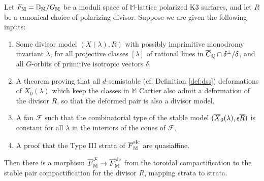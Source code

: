 \documentclass[table,x11names]{amsart}
\begin{document}
\begin{theorem}\label{threeinputs} Let $F_{\mathbb M}=\mathbb{D}_{\mathbb M}/G_{\mathbb M}$
be a moduli space of $\mathbb{M}$-lattice polarized K3 surfaces, and let $R$ be a canonical choice of
polarizing divisor. Suppose we are given the following inputs:
\begin{enumerate} 
\item[\bf (div)] Some divisor model $(X(\lambda),R)$ with
  possibly imprimitive
  monodromy invariant $\lambda$,
for all projective classes
$[\lambda]$ of rational lines in ${\overline C}_{\mathbb{Q}}\cap \delta^\perp/\delta$, and all $G$-orbits of
primitive isotropic vectors $\delta$.
\item[\bf (d-ss)] A theorem proving that all $d$-semistable (cf. Definition \ref{def:dss}) deformations of
$X_0(\lambda)$ which keep the classes in $\mathbb{M}$ Cartier also admit a deformation
of the divisor $R$, so that the deformed pair is also a divisor model.
\item[\bf (fan)] A fan $\mathcal{F}$ such that the combinatorial type of the stable model
$({\overline X}_0(\lambda),\epsilon{\overline R})$ is constant for all $\lambda$ in the interiors of the cones of $\mathcal{F}$.
\item[{\bf (qaff)}] A proof that the Type III strata of ${\overline F}_{\mathbb M}^{\rm slc}$ are quasiaffine.
\end{enumerate}
Then there is a morphism
${\overline F}_{\mathbb M}^{{\mathcal F}}\rightarrow{\overline F}_{\mathbb M}^{{\rm slc}}$
from the toroidal compactification to the stable pair compactification for the divisor $R$,
mapping strata to strata.
\end{theorem}
\end{document}
